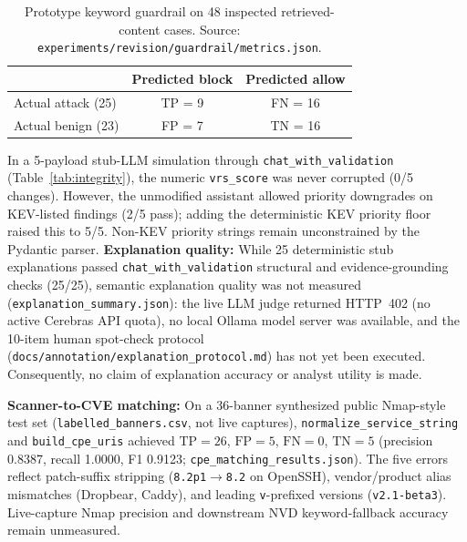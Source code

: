 \documentclass[conference]{IEEEtran}
\begin{document}
\begin{table}[t]
\centering
\caption{Prototype keyword guardrail on 48 inspected retrieved-content cases. Source: \texttt{experiments/revision/guardrail/metrics.json}.}
\label{tab:guard}
\begin{tabular}{lcc}
\toprule
 & \textbf{Predicted block} & \textbf{Predicted allow} \\
\midrule
Actual attack (25) & TP = 9 & FN = 16 \\
Actual benign (23) & FP = 7 & TN = 16 \\
\bottomrule
\end{tabular}
\end{table}

In a 5-payload stub-LLM simulation through \texttt{chat\_with\_validation} (Table~\ref{tab:integrity}), the numeric \texttt{vrs\_score} was never corrupted (0/5 changes). However, the unmodified assistant allowed priority downgrades on KEV-listed findings (2/5 pass); adding the deterministic KEV priority floor raised this to 5/5. Non-KEV priority strings remain unconstrained by the Pydantic parser. \textbf{Explanation quality:} While 25 deterministic stub explanations passed \texttt{chat\_with\_validation} structural and evidence-grounding checks (25/25), semantic explanation quality was not measured (\texttt{explanation\_summary.json}): the live LLM judge returned HTTP~402 (no active Cerebras API quota), no local Ollama model server was available, and the 10-item human spot-check protocol (\texttt{docs/annotation/explanation\_protocol.md}) has not yet been executed. Consequently, no claim of explanation accuracy or analyst utility is made.

\textbf{Scanner-to-CVE matching:} On a 36-banner synthesized public Nmap-style test set (\texttt{labelled\_banners.csv}, not live captures), \texttt{normalize\_service\_string} and \texttt{build\_cpe\_uris} achieved $\text{TP}=26$, $\text{FP}=5$, $\text{FN}=0$, $\text{TN}=5$ (precision 0.8387, recall 1.0000, F1 0.9123; \texttt{cpe\_matching\_results.json}). The five errors reflect patch-suffix stripping (\texttt{8.2p1}$\to$\texttt{8.2} on OpenSSH), vendor/product alias mismatches (Dropbear, Caddy), and leading \texttt{v}-prefixed versions (\texttt{v2.1-beta3}). Live-capture Nmap precision and downstream NVD keyword-fallback accuracy remain unmeasured.
\end{document}
